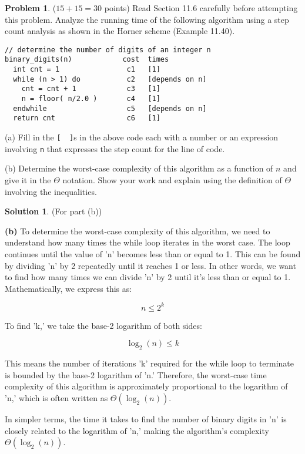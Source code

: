 \documentclass{article}
\theoremstyle{definition}
\newtheorem{problem}{Problem}
\newtheorem*{solution}{Solution}
\begin{document}
\newpage
\begin{problem} ($15+15=30$ points) Read Section 11.6 carefully before attempting this problem.
Analyze the running time of the following algorithm using a step count analysis 
as shown in the Horner scheme (Example 11.40).
\begin{verbatim}
// determine the number of digits of an integer n
binary_digits(n)            cost  times
  int cnt = 1                c1   [1]
  while (n > 1) do           c2   [depends on n]
    cnt = cnt + 1            c3   [1]
    n = floor( n/2.0 )       c4   [1]
  endwhile                   c5   [depends on n]
  return cnt                 c6   [1]
\end{verbatim}
\noindent
(a) Fill in the \verb|[  ]|s in the above code each with a number or an expression involving
\verb|n| that expresses the step count for the line of code.

\medskip
\noindent
(b) Determine the worst-case complexity of this algorithm as a function of $n$
and give it in the $\Theta$ notation.
Show your work and explain using the definition of $\Theta$ involving the inequalities. 
\end{problem}
\begin{solution} (For part (b))
\end{solution}
\textbf{(b)} 
To determine the worst-case complexity of this algorithm, we need to understand how many times the while loop iterates in the worst case. 
The loop continues until the value of 'n' becomes less than or equal to 1. This can be found by dividing 'n' by 2 
repeatedly until it reaches 1 or less. In other words, we want to find how many times we can divide 'n' by 2 until it's less than or equal to 1.
Mathematically, we express this as:

\[
n \leq 2^k
\]

To find 'k,' we take the base-2 logarithm of both sides:

\[
\log_2(n) \leq k
\]

This means the number of iterations 'k' required for the while loop to terminate is bounded by the base-2 logarithm of 'n.' Therefore, the worst-case time complexity of this algorithm is approximately proportional to the logarithm of 'n,' which is often written as $\Theta(\log_2(n))$.

In simpler terms, the time it takes to find the number of binary digits in 'n' is closely related to the logarithm of 'n,' making the algorithm's complexity $\Theta(\log_2(n))$.
\end{document}
